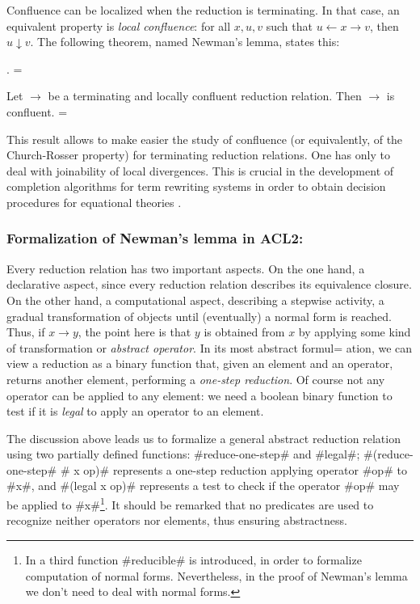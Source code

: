 \documentclass[11pt]{llncs}
\newcommand{\red}{\rightarrow}
\newcommand{\redi}{\leftarrow}
\begin{document}
{Confluence can be localized when the reduction is terminating. In that
case, an equivalent property is {\em local confluence}: for all $x,u,v$
such that $u \redi x \red v$, then $u\downarrow v$. The following
theorem, named Newman's lemma, states this:

\vspace{0.1cm}
. =

Let $\red$ be a terminating and locally confluent reduction
relation. Then $\red$ is confluent. =


This result allows to make easier the study of confluence (or
equivalently, of the Church-Rosser property) for terminating reduction
relations. One has only to deal with joinability of local
divergences. This is crucial in the development of completion
algorithms for term rewriting systems in order to obtain decision
procedures for equational theories \cite{Nipkow}.

\subsubsection{Formalization of Newman's lemma in ACL2:}

Every reduction relation has two important aspects. On the one hand, a
declarative aspect, since every reduction relation describes its
equivalence closure. On the other hand, a computational aspect,
describing a stepwise activity, a gradual transformation of objects
until (eventually) a normal form is reached. Thus, if $x\red y$, the
point here is that $y$ is obtained from $x$ by applying some kind
of transformation or {\em abstract operator}. In its most abstract formul=
ation,
we can view a reduction as a binary function that, given an element and
an operator, returns another element, performing a {\em one-step
reduction}. Of course not any operator can be applied to any element: we
need a boolean binary function to test if it is {\em legal} to apply an
operator to an element.

The discussion above leads us to formalize a general abstract reduction
relation using two partially defined functions: #reduce-one-step# and
#legal#; #(reduce-one-step# # x op)# represents a one-step reduction
applying operator #op# to #x#, and #(legal x op)# represents a test to
check if the operator #op# may be applied to #x#\footnote{In \cite{RR2}
a third function #reducible# is introduced, in order to formalize
computation of normal forms. Nevertheless, in the proof of Newman's
lemma we don't need to deal with normal forms.}. It should be remarked
that no predicates are used to recognize neither operators nor elements,
thus ensuring abstractness.

}
\end{document}
